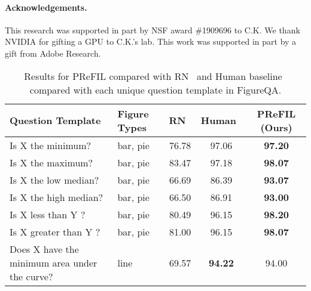 \documentclass[10pt,twocolumn]{article}
\begin{document}
\paragraph{Acknowledgements.} This research was supported in part by NSF award \#1909696 to C.K. We thank NVIDIA for gifting a GPU to C.K.'s lab. This work was supported in part by a gift from Adobe Research.


{\small


}

\appendix



\begin{table*}
\centering
\caption{Results for PReFIL compared with RN~\cite{santoro2017simple,figureqa} and Human baseline~\cite{figureqa} compared with each unique question template in FigureQA.}
  \vspace{1cm}
  \label{tab:extra-results}
\begin{tabular}{@{}llccc@{}}
\toprule
\textbf{Question Template}                    & \textbf{Figure Types} & \textbf{RN~\cite{santoro2017simple,figureqa}}               & \textbf{Human~\cite{figureqa}}            & \textbf{PReFIL (Ours)}                      \\ \midrule
Is X the minimum?                             & bar, pie              & 76.78                     & 97.06                     & \textbf{97.20}                     \\
Is X the maximum?                             & bar, pie              & 83.47                     & 97.18                     & \textbf{98.07}                     \\
Is X the low median?                          & bar, pie              & 66.69                     & 86.39                     & \textbf{93.07}                     \\
Is X the high median?                         & bar, pie              & 66.50                     & 86.91                     & \textbf{93.00}                     \\
Is X less than Y ?                            & bar, pie              & 80.49                     & 96.15                     & \textbf{98.20}                     \\
Is X greater than Y ?                         & bar, pie              & 81.00                     & 96.15                     & \textbf{98.07}                     \\
Does X have the minimum area under the curve? & line                  & 69.57                     & \textbf{94.22}            & 94.00                              \\

\end{tabular}
\end{table*}
\end{document}
